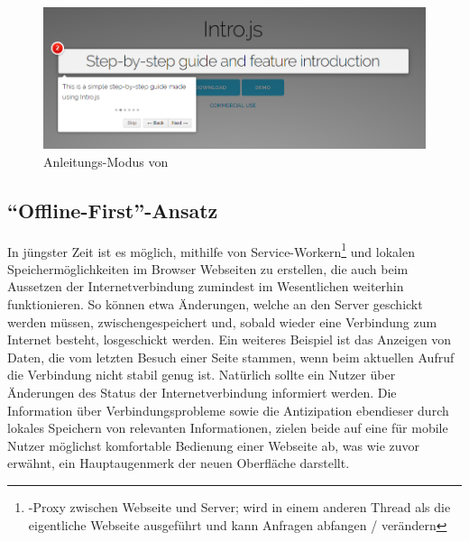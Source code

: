  \begin{figure}
    \centering
    \captionsetup{justification=centering}
    \includegraphics[width=\textwidth]{figures/intro_js_example.png}
        \caption{Anleitungs-Modus von  \parencite{mehrabani}}\label{fig:intro_js_example}
\end{figure}

\subsection{\enquote{Offline-First}-Ansatz}
In jüngster Zeit ist es möglich, mithilfe von Service-Workern\footnote{-Proxy zwischen Webseite und Server; wird in einem anderen Thread als die eigentliche Webseite ausgeführt und kann Anfragen abfangen / verändern} und lokalen Speichermöglichkeiten im Browser Webseiten zu erstellen, die auch beim Aussetzen der Internetverbindung zumindest im Wesentlichen weiterhin funktionieren. So können etwa Änderungen, welche an den Server geschickt werden müssen, zwischengespeichert und, sobald wieder eine Verbindung zum Internet besteht, losgeschickt werden. Ein weiteres Beispiel ist das Anzeigen von Daten, die vom letzten Besuch einer Seite stammen, wenn beim aktuellen Aufruf die Verbindung nicht stabil genug ist. Natürlich sollte ein Nutzer über Änderungen des Status der Internetverbindung informiert werden.
Die Information über Verbindungsprobleme sowie die Antizipation ebendieser durch lokales Speichern von relevanten Informationen, zielen beide auf eine für mobile Nutzer möglichst komfortable Bedienung einer Webseite ab, was wie zuvor erwähnt, ein Hauptaugenmerk der neuen Oberfläche darstellt.


